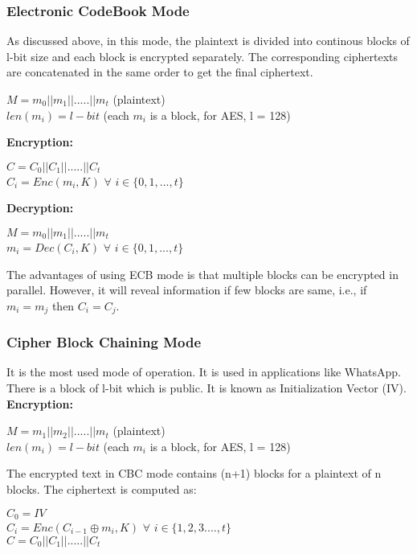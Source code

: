 \documentclass[11pt]{article}
\begin{document}
\subsubsection{Electronic CodeBook Mode}
As discussed above, in this mode, the plaintext is divided into continous blocks of l-bit size and each block is encrypted separately. The corresponding ciphertexts are concatenated in the same order to get the final ciphertext.
\begin{center}
    $M = m_0 || m_1 || ..... || m_t$ (plaintext)\\
    $len(m_i) = l-bit$ (each $m_i$ is a block, for AES, l = 128)
\end{center} 
\textbf{Encryption:}
\begin{center}
    $C = C_0 || C_1 || ..... || C_t$\\
    $C_i = Enc(m_i, K)$ $\forall$ $i \in \{0,1,...,t\}$
\end{center}
\textbf{Decryption:}
\begin{center}
    $M = m_0 || m_1 || ..... || m_t$\\
    $m_i = Dec(C_i, K)$ $\forall$ $i \in \{0,1,...,t\}$
\end{center}
The advantages of using ECB mode is that multiple blocks can be encrypted in parallel. However, it will reveal information if few blocks are same, i.e., if $m_i = m_j$ then $C_i = C_j$.

\subsubsection{Cipher Block Chaining Mode}
It is the most used mode of operation. It is used in applications like WhatsApp. There is a block of l-bit which is public. It is known as Initialization Vector (IV).\\
\newline
\textbf{Encryption:}
\begin{center}
    $M = m_1 || m_2 || ..... || m_t$ (plaintext)\\
    $len(m_i) = l-bit$ (each $m_i$ is a block, for AES, l = 128)\\
\end{center}
The encrypted text in CBC mode contains (n+1) blocks for a plaintext of n blocks. The ciphertext is computed as:
\begin{center}
    $C_0 = IV$\\
    $C_i = Enc(C_{i-1} \oplus m_i, K)$ $\forall$ $i \in \{1,2,3....,t\}$\\
    $C = C_0 || C_1 || ..... || C_t$
\end{center}
\end{document}
